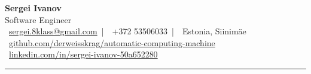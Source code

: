 \begin{center}
    {\Huge \textbf{Sergei Ivanov}} \\
    \vspace{2pt}
    {\large Software Engineer} \\
    \vspace{5pt}
    \small
    \faEnvelope\ \href{mailto:sergei.8klass@gmail.com}{sergei.8klass@gmail.com} \,|\,
    \faPhone\ +372 53506033 \,|\,
    \faMapMarker*\ Estonia, Siinimäe\\
    \faGithub\ \href{https://github.com/derweisskrag/automatic-computing-machine}{github.com/derweisskrag/automatic-computing-machine} \\
    \faLinkedin\ \href{https://www.linkedin.com/in/sergei-ivanov-50a652280}{linkedin.com/in/sergei-ivanov-50a652280}
\end{center}

\vfill
\hrule
\vspace{10pt}
